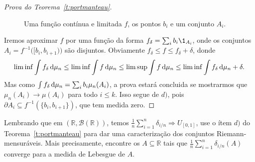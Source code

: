 \begin{topics}
\begin{proof}[Prova do Teorema~\ref{t:portmanteau}]
    \begin{figure}[!ht]
      \centering
      \caption{Uma função contínua e limitada $f$, os pontos $b_i$ e um conjunto $A_i$.}
    \end{figure}

    Iremos aproximar $f$ por uma função da forma $f_\delta = \sum_{i} b_i \1_{A_i}$, onde os conjuntos $A_i = f^{-1}\big( [b_i, b_{i+1}) \big)$ são disjuntos.
    Obviamente $f_\delta \leq f \leq f_\delta + \delta$, donde
    \begin{equation*}
      \liminf \int f_\delta \mathop{}\!\mathrm{d} \mu_n \leq \liminf \int f \mathop{}\!\mathrm{d} \mu_n \leq \limsup \int f \mathop{}\!\mathrm{d} \mu_n \leq \liminf \int f_\delta \mathop{}\!\mathrm{d} \mu_n + \delta.
    \end{equation*}
    Mas como $\int f_\delta \mathop{}\!\mathrm{d} \mu_n = \sum_i b_i \mu_n (A_i)$, a prova estará concluida se mostrarmos que $\mu_n (A_i) \to \mu(A_i)$ para todo $i \leq k$.
    Isso segue de $d)$, pois $\partial A_i \subseteq f^{-1}(\{b_i, b_{i+1}\})$, que tem medida zero.
  \end{proof}

  \begin{exercise}
    Lembrando que em $(\mathbb{R}, \mathcal{B}(\mathbb{R}))$, temos $\tfrac{1}{n} \sum_{i=1}^n \delta_{i/n} \Rightarrow U_{[0,1]}$, use o ítem $d)$ do Teorema~\ref{t:portmanteau} para dar uma caracterização dos conjuntos Riemann-mensuráveis.
    Mais precisamente, encontre os $A \subseteq \mathbb{R}$ tais que $\tfrac{1}{n} \sum_{i=1}^n \delta_{i/n}(A)$ converge para a medida de Lebesgue de $A$.
  \end{exercise}
\end{topics}

